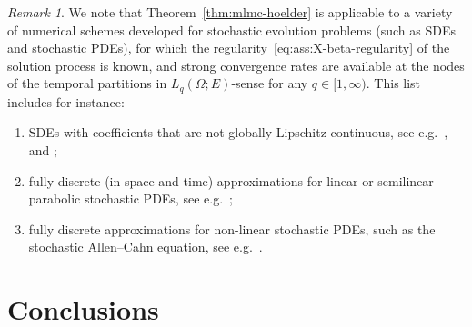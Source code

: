 \documentclass[reqno]{amsart}
\numberwithin{equation}{section}
\theoremstyle{remark}
\newtheorem{remark}[lemma]{Remark}
\theoremstyle{definition}
\begin{document}
\begin{remark} 
	We note that Theorem~\ref{thm:mlmc-hoelder} 
	is applicable 
	to a variety of numerical schemes  
	developed for stochastic evolution problems 
	(such as SDEs and stochastic PDEs), 
	for which the regularity~\eqref{eq:ass:X-beta-regularity} 
	of the solution process is known, and 
	strong convergence rates are available at 
	the nodes of the temporal partitions 
	in $L_q(\Omega;E)$-sense 
	for any $q\in[1,\infty)$. 
	This list includes for instance: 
	\begin{enumerate}[leftmargin=1cm, label=(\alph*)] 
		\item SDEs with coefficients that 
		are not globally Lipschitz continuous, 
		see e.g.~\cite[Theorem~3.1]{GyongyRasonyi2011},  
		\cite[Theorem~1.1]{HutzenthalerJentzenKloeden2012} 
		and 
		\cite[Theorem~4.5]{MullerGronbachYaroslavtseva2022}; 
		\item fully discrete (in space and time) 
		approximations for linear or semilinear 
		parabolic stochastic PDEs, 
		see e.g.~\cite[Theorem~3.14]{Kruse2014}; 
		\item fully discrete  
		approximations for non-linear stochastic PDEs, such as the 
		stochastic Allen--Cahn equation, 
		see e.g.~\cite[Theorem~1.1]{BeckerEtAl2022}. 
	\end{enumerate}
\end{remark} 

 
\section{Conclusions} 
\label{section:conclusions}   
\end{document}
